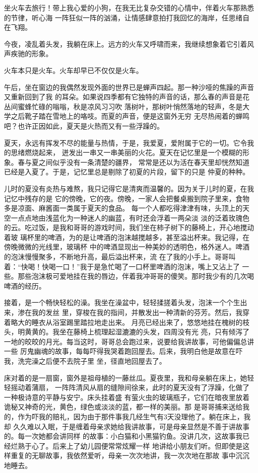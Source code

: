 		坐火车去旅行！带上我心爱的小狗，在我无比复杂交错的心情中，伴着火车那熟悉的节律，听心海
	一阵狂似一阵的汹涌，让情感肆意拍打我回忆的海岸，任思绪自在飞翔。

		今夜，凌乱着头发，我躺在床上。远方的火车又呼啸而来，我继续想象着它引着风声疾驰的形象。

		火车本只是火车。火车却早已不仅仅是火车。

	\endwriting



		午后，坐在窗边的我偶然发现外面的世界已是蝉声四起。那一种沙哑的焦躁的声音又重新回到了我
	的耳朵。如果说四季都有它独特的声音的话，那么春的声音是花丛间蜜蜂忙碌的嗡嗡，秋是凉风习习吹
	落树叶，那树叶悄然落地的轻声，冬是大学之后靴子踏在雪地上的咯吱。而夏的声音，便是这窗外无穷
	无尽热闹着的蝉鸣吧？也许正因如此，夏天是火热而又有一些浮躁的。

		夏天，永远有挥发不尽的能量与热情，于是，我爱夏，爱附属于它的一切。它令我的思绪燃烧起来，
	迸发出一串又一串美丽的火花。夏天在记忆里是一个模糊的形象。春与夏之间似乎没有一条清楚的疆界，
	常常是还以为活在春天里却恍然知道已经是入夏了。于是，记忆里总是剔除了初夏的片段，留下的只是
	仲夏的种种。

		儿时的夏没有炎热与难熬，我只记得它是清爽而温馨的。因为关于儿时的夏，在我记忆中残存的是
	它的傍晚，它的夜。傍晚，一家人会把餐桌搬到院子里来，食物多是凉面、麻酱面一类属于夏天的食品。
	每一个人都吃得津津有味，头顶上的天空一点点地由浅蓝化为一种迷人的幽蓝，有时还会浮着一两朵淡
	淡的泛着玫瑰色的云。吃过饭，是我和哥哥的游戏时间，我们坐在柿子树下的藤椅上，开心地搅动着玻
	璃杯里的啤酒，为的是让啤酒的泡沫越搅越多，甚至溢出杯来。我记得，在傍晚微微的光线里，玻璃杯
	中的啤酒显现出一种美妙的透明色，格外迷人。啤酒的泡沫慢慢聚多，不断地升高，最后溢出杯来，流
	在了我的小手上。哥哥叫着：“快喝！快喝一口！”我于是急忙喝了一口杯里啤酒的泡沫，嘴上又沾上了
	一些。那些泡沫极可爱地挂在我的唇边，伴着我冲哥哥的傻笑。那时我少有的几次喝啤酒的经历。

		接着，是一个畅快轻松的澡。我坐在澡盆中，轻轻揉搓着头发，泡沫一个个生出来，渗在我的发丝
	里，穿梭在我的指间，并散发出一种清新的芬芳。然后，我穿着略大的睡衣从浴室踢里踏拉地走出来。
	月亮已经出来了，悠悠地挂在槐树的枝头，明黄黄的。我坐在藤椅上梳理起湿漉漉的头发，四周没有光
	亮，只有倾泻了一地的皎皎的月光。每当这时，哥哥总会跑过来，说要给我讲故事，可他偏偏总讲一些
	厉鬼幽魂的故事，每每吓得我哭着跑回屋去。后来，我明白他是故意在吓我，洗完澡之后便不去院子里
	坐，径直地回屋去了。

		床对着的是一扇窗，窗外是祖母植的一藤丝瓜。夏夜里，我和母亲躺在床上，她轻轻摇动着蒲扇，
	一阵阵清风从扇的缝隙间徐来，此时的夏天没有了浮躁，化做了一种极诗意的平静与安宁。床头挂着盛
	有萤火虫的玻璃瓶子，它们在暗夜里放着诡秘又神奇的光，黄色，绿色或淡淡的蓝，都一样的美丽。那
	是哥哥捕来送给我的，作为吓我的赔礼，因为由于那件事我几经生气有3天没理他了。躺在床上，我却
	久久难以入眠，于是缠着母亲求她给我讲故事，可是母亲显然是不善于讲故事的。每一次她都会讲同样
	的故事：小白猫和小黑猫钓鱼。没讲几次，这故事我已经烂熟于心了。后来上了幼儿园便常常炫耀一样
	地讲给小朋友们听。但即使是这样重复的无聊故事，我依然爱听，母亲一次次地讲，我一次次地在那故
	事中沉沉地睡去。

